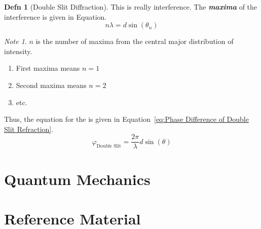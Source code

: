 \documentclass[10pt,letterpaper,final,twoside,notitlepage]{article}
\numberwithin{equation}{section} %
\theoremstyle{definition}
\newtheorem{definition}{Defn} %
\theoremstyle{remark}
\newtheorem{note}{Note}[definition] %
\begin{document}
		\begin{definition}[Double Slit Diffraction] \label{def:Single Slit Diffraction}
			This is really interference.
			The \emph{\textbf{maxima}} of the interference is given in Equation.
			\begin{equation} \label{eq:Maxima of Double Slit Diffraction}
				n \lambda = d \sin \left( \theta_{n} \right)
			\end{equation}
			\begin{note}
				$n$ is the number of maxima from the central major distribution of intensity.
				\begin{enumerate}
					\item First maxima means $n=1$
					\item Second maxima means $n=2$
					\item etc.
				\end{enumerate}
			\end{note}
			Thus, the equation for the  is given in Equation~\eqref{eq:Phase Difference of Double Slit Refraction}.
			\begin{equation} \label{eq:Phase Difference of Double Slit Refraction}
				\varphi_{\text{Double Slit}} = \frac{2 \pi}{\lambda} d \sin \left( \theta \right)
			\end{equation}
		\end{definition}
	

\section{Quantum Mechanics} \label{sec:Quantum Mech}

\appendix
\clearpage
\section{Reference Material} \label{sec:Reference Material}



\end{document}
